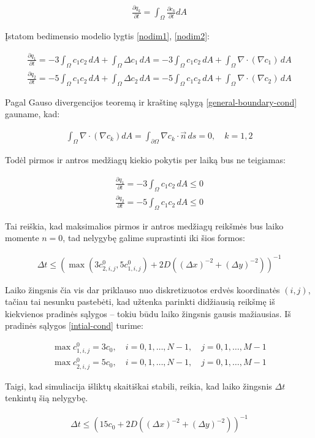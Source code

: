 \begin{align}
  \frac{\partial q_k}{\partial t} = \int_\Omega \frac{\partial c_k}{\partial t} dA
\end{align}

Įstatom bedimensio modelio lygtis \eqref{nodim1}, \eqref{nodim2}:

\begin{align}
  \frac{\partial q_1}{\partial t}=-3\int_\Omega c_1c_2\,dA + \int_\Omega \Delta c_1\,dA=-3\int_\Omega c_1c_2\,dA + \int_\Omega \nabla \cdot (\nabla c_1)\,dA\\
  \frac{\partial q_2}{\partial t}=-5\int_\Omega c_1c_2\,dA + \int_\Omega \Delta c_2\,dA=-5\int_\Omega c_1c_2\,dA + \int_\Omega \nabla \cdot (\nabla c_2)\,dA
\end{align}

\newpage
Pagal Gauso divergencijos teoremą ir kraštinę sąlygą \eqref{general-boundary-cond} gauname, kad:

\begin{align}
\int_\Omega \nabla \cdot (\nabla c_k) dA = \int_{\partial\Omega} \nabla c_k \cdot \vec{n}\, ds = 0,\quad k=1,2
\end{align}

Todėl pirmos ir antros medžiagų kiekio pokytis per laiką bus ne teigiamas:

\begin{align}
  \frac{\partial q_1}{\partial t}=-3\int_\Omega c_1c_2\,dA \leqslant 0\\
  \frac{\partial q_2}{\partial t}=-5\int_\Omega c_1c_2\,dA\leqslant 0
\end{align}

Tai reiškia, kad maksimalios pirmos ir antros medžiagų reikšmės bus laiko momente $n=0$, tad nelygybę galime suprastinti iki šios formos:

\begin{align}
  \Delta t \leqslant \left(\max(3c^{0}_{2,i,j}, 5c^{0}_{1,i,j})+2D\left((\Delta x)^{-2}+(\Delta y)^{-2}\right)\right)^{-1}
\end{align}

Laiko žingsnis čia vis dar priklauso nuo diskretizuotos erdvės koordinatės $(i, j)$, tačiau tai nesunku pastebėti, kad užtenka parinkti didžiausią reikšmę iš kiekvienos pradinės sąlygos -- tokiu būdu laiko žingsnis gausis mažiausias. Iš pradinės sąlygos \eqref{intial-cond} turime:

\begin{align*}
\max c^0_{1,i,j}=3c_0,\quad i=0,1,\dots,N-1, \quad j=0,1,\dots,M-1\\
\max c^0_{2,i,j}=5c_0,\quad i=0,1,\dots,N-1, \quad j=0,1,\dots,M-1
\end{align*}

Taigi, kad simuliacija išliktų skaitiškai stabili, reikia, kad laiko žingsnis $\Delta t$ tenkintų šią nelygybę.

\begin{align*}
  \Delta t \leqslant \left(15c_0+2D\left((\Delta x)^{-2}+(\Delta y)^{-2}\right)\right)^{-1}
\end{align*}

